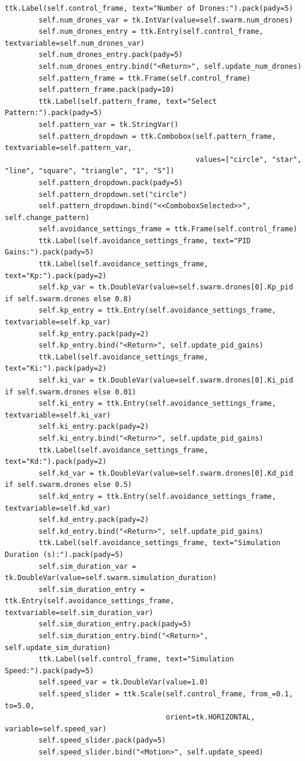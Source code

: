 \documentclass[11pt]{article}
\begin{document}
\begin{lstlisting}[style=pythonstyle]
        ttk.Label(self.control_frame, text="Number of Drones:").pack(pady=5)
        self.num_drones_var = tk.IntVar(value=self.swarm.num_drones)
        self.num_drones_entry = ttk.Entry(self.control_frame, textvariable=self.num_drones_var)
        self.num_drones_entry.pack(pady=5)
        self.num_drones_entry.bind("<Return>", self.update_num_drones)
        self.pattern_frame = ttk.Frame(self.control_frame)
        self.pattern_frame.pack(pady=10)
        ttk.Label(self.pattern_frame, text="Select Pattern:").pack(pady=5)
        self.pattern_var = tk.StringVar()
        self.pattern_dropdown = ttk.Combobox(self.pattern_frame, textvariable=self.pattern_var,
                                             values=["circle", "star", "line", "square", "triangle", "1", "S"])
        self.pattern_dropdown.pack(pady=5)
        self.pattern_dropdown.set("circle")
        self.pattern_dropdown.bind("<<ComboboxSelected>>", self.change_pattern)
        self.avoidance_settings_frame = ttk.Frame(self.control_frame)
        ttk.Label(self.avoidance_settings_frame, text="PID Gains:").pack(pady=5)
        ttk.Label(self.avoidance_settings_frame, text="Kp:").pack(pady=2)
        self.kp_var = tk.DoubleVar(value=self.swarm.drones[0].Kp_pid if self.swarm.drones else 0.8)
        self.kp_entry = ttk.Entry(self.avoidance_settings_frame, textvariable=self.kp_var)
        self.kp_entry.pack(pady=2)
        self.kp_entry.bind("<Return>", self.update_pid_gains)
        ttk.Label(self.avoidance_settings_frame, text="Ki:").pack(pady=2)
        self.ki_var = tk.DoubleVar(value=self.swarm.drones[0].Ki_pid if self.swarm.drones else 0.01)
        self.ki_entry = ttk.Entry(self.avoidance_settings_frame, textvariable=self.ki_var)
        self.ki_entry.pack(pady=2)
        self.ki_entry.bind("<Return>", self.update_pid_gains)
        ttk.Label(self.avoidance_settings_frame, text="Kd:").pack(pady=2)
        self.kd_var = tk.DoubleVar(value=self.swarm.drones[0].Kd_pid if self.swarm.drones else 0.5)
        self.kd_entry = ttk.Entry(self.avoidance_settings_frame, textvariable=self.kd_var)
        self.kd_entry.pack(pady=2)
        self.kd_entry.bind("<Return>", self.update_pid_gains)
        ttk.Label(self.avoidance_settings_frame, text="Simulation Duration (s):").pack(pady=5)
        self.sim_duration_var = tk.DoubleVar(value=self.swarm.simulation_duration)
        self.sim_duration_entry = ttk.Entry(self.avoidance_settings_frame, textvariable=self.sim_duration_var)
        self.sim_duration_entry.pack(pady=5)
        self.sim_duration_entry.bind("<Return>", self.update_sim_duration)
        ttk.Label(self.control_frame, text="Simulation Speed:").pack(pady=5)
        self.speed_var = tk.DoubleVar(value=1.0)
        self.speed_slider = ttk.Scale(self.control_frame, from_=0.1, to=5.0,
                                      orient=tk.HORIZONTAL, variable=self.speed_var)
        self.speed_slider.pack(pady=5)
        self.speed_slider.bind("<Motion>", self.update_speed)


\end{lstlisting}
\end{document}
